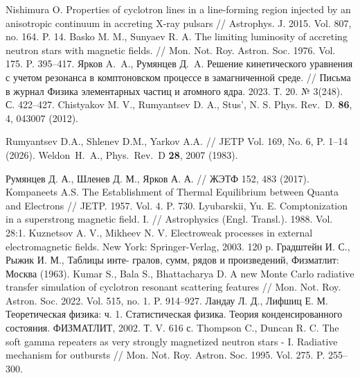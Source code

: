 \documentclass[14pt, russian]{article}
\begin{document}
\begin{thebibliography}{}
Nishimura O. Properties of cyclotron lines in a line-forming region injected by
an anisotropic continuum in accreting X-ray pulsars // Astrophys. J. 2015.
Vol. 807, no. 164. P. 14.
%
Basko M. M., Sunyaev R. A. The limiting luminosity of accreting neutron
stars with magnetic fields. // Mon. Not. Roy. Astron. Soc. 1976. Vol. 175.
P. 395–417.
%
Ярков A.~A., Румянцев Д.~A. Решение кинетического уравнения с учетом резонанса в комптоновском процессе в замагниченной среде. // Письма в журнал Физика элементарных частиц и атомного ядра. 2023. Т. 20. № 3(248). С. 422--427.
%
Chistyakov M. V., Rumyantsev D. A., Stus', N. S.
Phys. Rev.~D. {\bf 86}, 4, 043007 (2012).
%

%
Rumyantsev D.A., Shlenev D.M., Yarkov A.A. // JETP Vol. 169, No. 6, P. 1--14 (2026).
%
Weldon~H.~A., Phys.~Rev.~D {\bf 28}, 2007 (1983).

Румянцев Д. А., Шленев Д. М., Ярков А. А. // ЖЭТФ 152, 483 (2017).
%
Kompaneets A.S. The Establishment of Thermal Equilibrium between Quanta and Electrons // JETP. 1957. Vol. 4. P. 730.
%
Lyubarskii, Yu. E. Comptonization in a superstrong magnetic field. I. // Astrophysics (Engl. Transl.). 1988. Vol. 28:1.
%
Kuznetsov A. V., Mikheev N. V. Electroweak processes in external electromagnetic
fields. New York: Springer-Verlag, 2003. 120 p.
%
Градштейн И. С., Рыжик И. М., Таблицы инте-
гралов, сумм, рядов и произведений, Физматлит:
Москва (1963).
%
Kumar S., Bala S., Bhattacharya D. A new Monte Carlo radiative transfer
simulation of cyclotron resonant scattering features // Mon. Not. Roy. Astron.
Soc. 2022. Vol. 515, no. 1. P. 914–927.
%
Ландау Л. Д., Лифшиц Е. М. Теоретическая физика: ч. 1. Статистическая
физика. Теория конденсированного состояния. ФИЗМАТЛИТ, 2002. Т. V.
616 с.
%
Thompson C., Duncan R. C. The soft gamma repeaters as very strongly magnetized
neutron stars - I. Radiative mechanism for outbursts // Mon. Not.
Roy. Astron. Soc. 1995. Vol. 275. P. 255–300.
%

\end{thebibliography}
\end{document}
